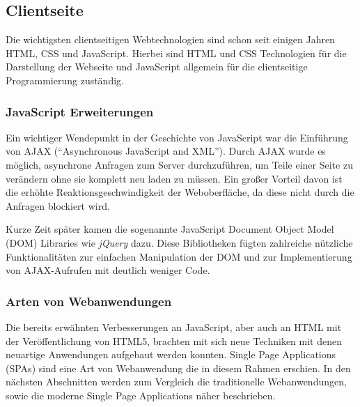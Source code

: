 \subsection{Clientseite}
Die wichtigsten clientseitigen Webtechnologien sind schon seit einigen Jahren HTML, CSS und JavaScript. Hierbei sind HTML und CSS Technologien für die Darstellung der Webseite und JavaScript allgemein für die clientseitige Programmierung zuständig\cite{Thattil2016}. 

\subsubsection{JavaScript Erweiterungen}
Ein wichtiger Wendepunkt in der Geschichte von JavaScript war die Einführung von \acs{AJAX} (\enquote{Asynchronous JavaScript and XML}). Durch AJAX wurde es möglich, asynchrone Anfragen zum Server durchzuführen, um Teile einer Seite zu verändern ohne sie komplett neu laden zu müssen. Ein großer Vorteil davon ist die erhöhte Reaktionsgeschwindigkeit der Weboberfläche, da diese nicht durch die Anfragen blockiert wird.

Kurze Zeit später kamen die sogenannte JavaScript Document Object Model (\acs{DOM}) Libraries wie \textit{jQuery} dazu. Diese Bibliotheken fügten zahlreiche nützliche Funktionalitäten zur einfachen Manipulation der DOM und zur Implementierung von AJAX-Aufrufen mit deutlich weniger Code\cite{Fink2014}.

\subsubsection{Arten von Webanwendungen}
Die bereits erwähnten Verbesserungen an JavaScript, aber auch an HTML mit der Veröffentlichung von HTML5, brachten mit sich neue Techniken mit denen neuartige Anwendungen aufgebaut werden konnten. Single Page Applications (\acs{SPA}s) sind eine Art von Webanwendung die in diesem Rahmen erschien. In den nächsten Abschnitten werden zum Vergleich die traditionelle Webanwendungen, sowie die moderne Single Page Applications näher beschrieben.







